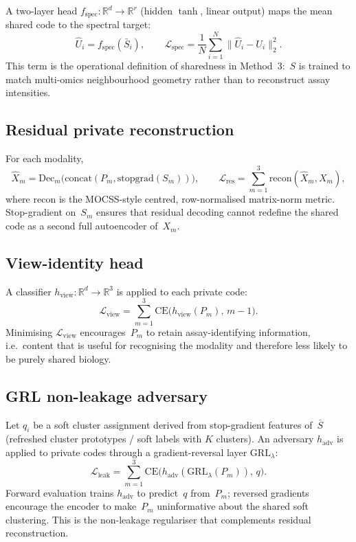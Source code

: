 A two-layer head $f_{\mathrm{spec}}:\mathbb{R}^{d}\rightarrow\mathbb{R}^{r}$ (hidden $\tanh$, linear output) maps the mean shared code to the spectral target:
\begin{equation}
\hat{U}_i = f_{\mathrm{spec}}(\bar{S}_i),
\qquad
\mathcal{L}_{\mathrm{spec}}
=
\frac{1}{N}\sum_{i=1}^{N}
\bigl\|\hat{U}_i - U_i\bigr\|_{2}^{2}.
\end{equation}
This term is the operational definition of sharedness in Method~3:~$S$ is trained to match multi-omics neighbourhood geometry rather than to reconstruct assay intensities.

\subsection{Residual private reconstruction}

For each modality,
\begin{equation}
\hat{X}_m
=
\mathrm{Dec}_m\bigl(\mathrm{concat}(P_m,\mathrm{stopgrad}(S_m))\bigr),
\qquad
\mathcal{L}_{\mathrm{res}}
=
\sum_{m=1}^{3}
\mathrm{recon}(\hat{X}_m,X_m),
\end{equation}
where $\mathrm{recon}$ is the MOCSS-style centred, row-normalised matrix-norm metric. Stop-gradient on~$S_m$ ensures that residual decoding cannot redefine the shared code as a second full autoencoder of~$X_m$.

\subsection{View-identity head}

A classifier $h_{\mathrm{view}}:\mathbb{R}^{d}\rightarrow\mathbb{R}^{3}$ is applied to each private code:
\begin{equation}
\mathcal{L}_{\mathrm{view}}
=
\sum_{m=1}^{3}
\mathrm{CE}\bigl(h_{\mathrm{view}}(P_m),\, m-1\bigr).
\end{equation}
Minimising $\mathcal{L}_{\mathrm{view}}$ encourages~$P_m$ to retain assay-identifying information, i.e.\ content that is useful for recognising the modality and therefore less likely to be purely shared biology.

\subsection{GRL non-leakage adversary}

Let $q_i$ be a soft cluster assignment derived from stop-gradient features of~$\bar{S}$ (refreshed cluster prototypes / soft labels with $K$ clusters). An adversary $h_{\mathrm{adv}}$ is applied to private codes through a gradient-reversal layer $\mathrm{GRL}_\lambda$:
\begin{equation}
\mathcal{L}_{\mathrm{leak}}
=
\sum_{m=1}^{3}
\mathrm{CE}\bigl(h_{\mathrm{adv}}(\mathrm{GRL}_\lambda(P_m)),\, q\bigr).
\end{equation}
Forward evaluation trains $h_{\mathrm{adv}}$ to predict~$q$ from~$P_m$; reversed gradients encourage the encoder to make~$P_m$ uninformative about the shared soft clustering. This is the non-leakage regulariser that complements residual reconstruction.

